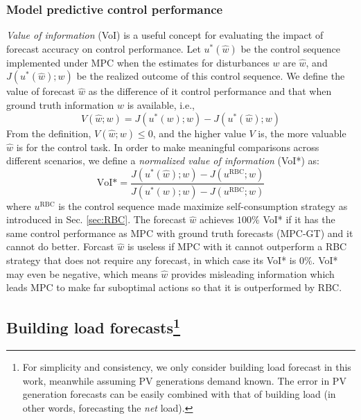 \subsubsection{Model predictive control performance} %

\emph{Value of information} (VoI) is a useful concept for evaluating the impact of forecast accuracy on control performance. Let $u^*(\hat{w})$ be the control sequence implemented under MPC when the estimates for disturbances $w$ are $\hat{w}$, and $J(u^*(\hat{w}); w)$ be the realized outcome of this control sequence. We define the value of forecast $\hat{w}$ as the difference of it control performance and that when ground truth information $w$ is available, i.e.,
\begin{equation}
    V(\hat{w}; w) =  J(u^*(w); w) - J(u^*(\hat{w}); w)
\end{equation}
From the definition, $V(\hat{w}; w) \le 0$, and the higher value $V$ is, the more valuable $\hat{w}$ is for the control task. In order to make meaningful comparisons across different scenarios, we define a \emph{normalized value of information} (VoI*) as:
\begin{equation}
    \text{VoI*} = \frac{J(u^*(\hat{w}); w) - J(u^{\text{RBC}}; w)}{J(u^*(w); w) - J(u^{\text{RBC}}; w)}
\end{equation}
where $u^{\text{RBC}}$ is the control sequence made maximize self-consumption strategy as introduced in Sec. \ref{sec:RBC}. The forecast $\hat{w}$ achieves $100\%$ VoI* if it has the same control performance as MPC with ground truth forecasts (MPC-GT) and it cannot do better. Forcast $\hat{w}$ is useless if MPC with it cannot outperform a RBC strategy that does not require any forecast, in which case its VoI* is $0\%$. VoI* may even be negative, which means $\hat{w}$ provides misleading information which leads MPC to make far suboptimal actions so that it is outperformed by RBC.



\subsection[Building load forecasts]{Building load forecasts\footnote{For simplicity and consistency, we only consider building load forecast in this work, meanwhile assuming PV generations demand known. The error in PV generation forecasts can be easily combined with that of building load (in other words, forecasting the \emph{net} load).} }
\label{section:Building load forecasts}

